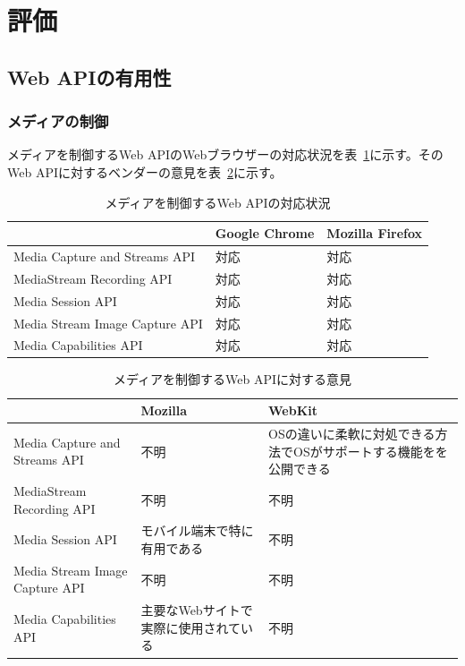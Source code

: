 \section{評価}
\label{section:評価}
\subsection{Web APIの有用性}
\label{subsection:PWAにおけるWeb APIの有用性}
\subsubsection{メディアの制御}
\label{subsubsection:メディアの制御}
メディアを制御するWeb APIのWebブラウザーの対応状況を表~\ref{table:メディアを制御するWeb APIの対応状況}に示す。そのWeb APIに対するベンダーの意見を表~\ref{table:メディアを制御するWeb APIに対する意見}に示す。
\begin{table}
  \caption{メディアを制御するWeb APIの対応状況}
  \label{table:メディアを制御するWeb APIの対応状況}
  \centering
  \begin{tabular}{|p{13em}|p{8em}|p{8em}|}
    \hline
    & Google Chrome & Mozilla Firefox \\ \hline
    Media Capture and Streams API & \cellcolor{green!25}対応 & \cellcolor{green!25}対応 \\ \hline
    MediaStream Recording API & \cellcolor{green!25}対応 & \cellcolor{green!25}対応 \\ \hline
    Media Session API & \cellcolor{green!25}対応 & \cellcolor{green!25}対応 \\ \hline
    Media Stream Image Capture API & \cellcolor{green!25}対応 & \cellcolor{green!25}対応 \\ \hline
    Media Capabilities API & \cellcolor{green!25}対応 & \cellcolor{green!25}対応 \\ \hline
  \end{tabular}
\end{table}
\begin{table}
  \caption{メディアを制御するWeb APIに対する意見}
  \label{table:メディアを制御するWeb APIに対する意見}
    \centering
    \begin{tabular}{|p{13em}|p{13em}|p{13em}|}
        \hline
        & Mozilla & WebKit \\ \hline
        Media Capture and Streams API & 不明 & \cellcolor{green!25}OSの違いに柔軟に対処できる方法でOSがサポートする機能をを公開できる\cite{WebKitMediaCaptureandStreamsAPI} \\ \hline
        MediaStream Recording API & 不明 & 不明 \\ \hline
        Media Session API & \cellcolor{green!25}モバイル端末で特に有用である~\cite{MozillaMediaSessionAPI} & 不明 \\ \hline
        Media Stream Image Capture API & 不明 & 不明 \\ \hline
        Media Capabilities API & \cellcolor{green!25}主要なWebサイトで実際に使用されている\cite{MozillaMediaCapabilitiesAPI} & 不明 \\ \hline
    \end{tabular}
\end{table}
